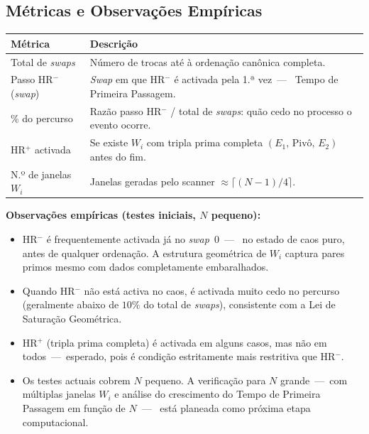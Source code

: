 \documentclass[12pt, a4paper]{article}
\theoremstyle{plain}
\theoremstyle{definition}
\theoremstyle{remark}
\begin{document}
	\subsection{Métricas e Observações Empíricas}
	
	\begin{center}
		\begin{tabular}{p{4.5cm}p{9cm}}
			\toprule
			Métrica & Descrição\\
			\midrule
			Total de \emph{swaps} &
			Número de trocas até à ordenação canônica completa.\\[4pt]
			Passo HR$^-$ (\emph{swap}) &
			\emph{Swap} em que HR$^-$ é activada pela 1.ª vez~---~
			Tempo de Primeira Passagem.\\[4pt]
			\% do percurso &
			Razão passo HR$^-$ / total de \emph{swaps}: quão cedo
			no processo o evento ocorre.\\[4pt]
			HR$^+$ activada &
			Se existe $W_i$ com tripla prima completa
			$(E_1,\,\text{Pivô},\,E_2)$ antes do fim.\\[4pt]
			N.º de janelas $W_i$ &
			Janelas geradas pelo scanner
			$\approx\lceil(N-1)/4\rceil$.\\
			\bottomrule
		\end{tabular}
	\end{center}
	
	\medskip\noindent\textbf{Observações empíricas (testes iniciais,
		$N$ pequeno):}
	\begin{itemize}
		\item HR$^-$ é frequentemente activada já no \emph{swap}~$0$~---~
		no estado de caos puro, antes de qualquer ordenação.  A estrutura
		geométrica de $W_i$ captura pares primos mesmo com dados
		completamente embaralhados.
		\item Quando HR$^-$ não está activa no caos, é activada muito
		cedo no percurso (geralmente abaixo de $10\%$ do total de
		\emph{swaps}), consistente com a Lei de Saturação Geométrica.
		\item HR$^+$ (tripla prima completa) é activada em alguns casos,
		mas não em todos~---~esperado, pois é condição estritamente mais
		restritiva que HR$^-$.
		\item Os testes actuais cobrem $N$ pequeno.  A verificação para
		$N$ grande~---~com múltiplas janelas $W_i$ e análise do
		crescimento do Tempo de Primeira Passagem em função de $N$~---~
		está planeada como próxima etapa computacional.
	\end{itemize}
	
\end{document}
